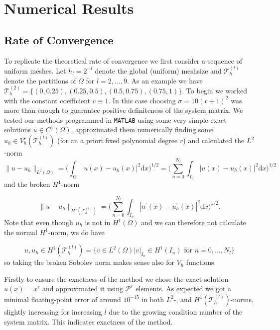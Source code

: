 \section{Numerical Results}
\subsection{Rate of Convergence}
\label{subsec:conv_rate_ell}
To replicate the theoretical rate of convergence we first consider a sequence of uniform meshes. 
Let $h_l = 2^{-l}$ denote the global (uniform) meshsize and $\mathcal{T}_h^{(l)}$ denote
the partitions of $\Omega$ for $l = 2,\ldots,9$. As an example we have $\mathcal{T}_h^{(2)} = \{(0, 0.25), (0.25, 0.5),(0.5, 0.75),(0.75, 1)\}$. 
To begin we worked with the constant coefficient $c\equiv 1$. In this case choosing $\sigma = 10(r+1)^2$ was more than enough to guarantee positive definiteness of the 
system matrix.
We tested our methods programmed in \texttt{MATLAB} using some very simple exact solutions $u \in C^1(\Omega)$, approximated them numerically finding some $u_h \in V_h^r(\mathcal{T}_h^{(l)})$ 
(for an a priori fixed polynomial degree $r$) and calculated the $L^2$-norm
\begin{equation}
	\|u - u_h\|_{L^2(\Omega)} = \Big( \int_{\Omega} |u(x) - u_h(x)|^2 \text{d} x \Big)^{1/2} = \Big( \sum_{n=0}^{N_l}\int_{I_n} |u(x) - u_h(x)|^2 \text{d} x \Big)^{1/2} \nonumber
\end{equation}
and the broken $H^1$-norm

\begin{equation}
	\|u - u_h\|_{H^1(\mathcal{T}_h^{(l)} )} = \Big( \sum_{n=0}^{N_l}\int_{I_n} |u^{\prime}(x) - u_h^{\prime}(x)|^2 \text{d} x \Big)^{1/2}. \nonumber
\end{equation}
Note that even though $u_h$ is not in $H^1(\Omega)$ and we can therefore not calculate the normal $H^1$-norm, we do have 

\begin{equation}
	u, u_h \in H^1(\mathcal{T}_h^{(l)}) = \{v \in L^2(\Omega) | v|_{I_n} \in  H^1(I_n) \text{ for } n = 0,\ldots,N_l\} \nonumber
\end{equation}
so taking the broken Sobolev norm makes sense also for $V_h$ functions.

Firstly to ensure the exactness of the method we chose
the exact solution $u(x) = x^r$ and approximated it using $\mathcal{P}^r$ elements. As expected we got a minimal floating-point error of around $10^{-15}$
in both $L^2$-, and $H^1(\mathcal{T}^{(l)}_h)$-norms, slightly increasing for increasing $l$ due to the growing condition number of the system matrix.
This indicates exactness of the method.


